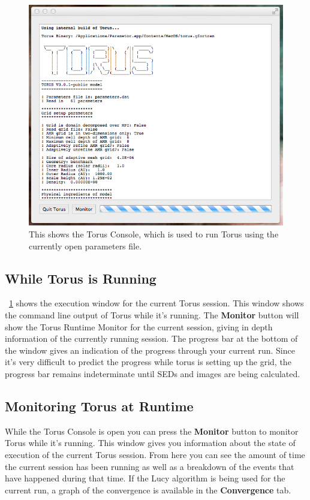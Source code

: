 \documentclass[a4paper,10pt]{article}
\newcommand{\figref}[2][\figurename~]{#1\ref{#2}}
\begin{document}
\begin{figure}
\includegraphics[width=12.5cm]{img/run-torus-console.png}
\caption{This shows the Torus Console, which is used to run Torus using the currently open parameters file.}
\label{fig:run-torus-console}
\end{figure}

\subsection{While Torus is Running}
\figref{fig:run-torus-console} shows the execution window for the current Torus session. This window shows the command line output of Torus while it's running. The \textbf{Monitor} button will show the Torus Runtime Monitor for the current session, giving in depth information of the currently running session. The progress bar at the bottom of the window gives an indication of the progress through your current run. Since it's very difficult to predict the progress while torus is setting up the grid, the progress bar remains indeterminate until SEDs and images are being calculated.

\subsection{Monitoring Torus at Runtime}
While the Torus Console is open you can press the \textbf{Monitor} button to monitor Torus while it's running. This window gives you information about the state of execution of the current Torus session. From here you can see the amount of time the current session has been running as well as a breakdown of the events that have happened during that time. If the Lucy algorithm is being used for the current run, a graph of the convergence is available in the \textbf{Convergence} tab.
\end{document}
